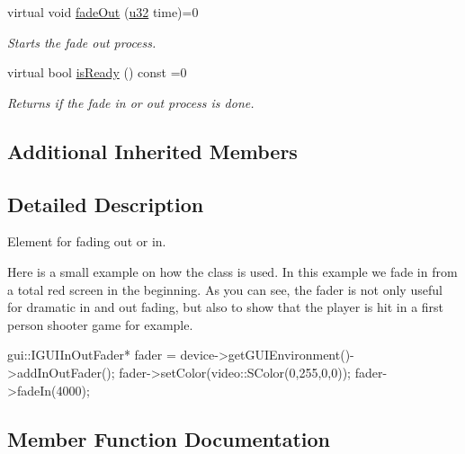 \begin{DoxyCompactItemize}
virtual void \hyperlink{classirr_1_1gui_1_1IGUIInOutFader_a5006c28699050d73be11b15ffc7ba993}{fade\+Out} (\hyperlink{namespaceirr_a0416a53257075833e7002efd0a18e804}{u32} time)=0
\begin{DoxyCompactList}\small\item\em Starts the fade out process. \end{DoxyCompactList}\item 
\mbox{\label{classirr_1_1gui_1_1IGUIInOutFader_a8a917f7c5c74ff0bdb2ba844f1953387}} 
virtual bool \hyperlink{classirr_1_1gui_1_1IGUIInOutFader_a8a917f7c5c74ff0bdb2ba844f1953387}{is\+Ready} () const =0
\begin{DoxyCompactList}\small\item\em Returns if the fade in or out process is done. \end{DoxyCompactList}\end{DoxyCompactItemize}
\subsection*{Additional Inherited Members}


\subsection{Detailed Description}
Element for fading out or in. 

Here is a small example on how the class is used. In this example we fade in from a total red screen in the beginning. As you can see, the fader is not only useful for dramatic in and out fading, but also to show that the player is hit in a first person shooter game for example. 
\begin{DoxyCode}
gui::IGUIInOutFader* fader = device->getGUIEnvironment()->addInOutFader();
fader->setColor(video::SColor(0,255,0,0));
fader->fadeIn(4000);
\end{DoxyCode}
 

\subsection{Member Function Documentation}
\mbox{\label{classirr_1_1gui_1_1IGUIInOutFader_a407edab8f7e349612d62c39accc159e2}} 
